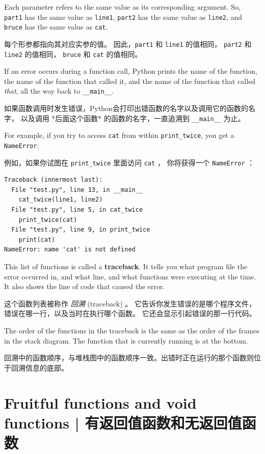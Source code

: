Each parameter refers to the same value as its corresponding
argument.  So, {\tt part1} has the same value as
{\tt line1}, {\tt part2} has the same value as {\tt line2},
and {\tt bruce} has the same value as {\tt cat}.

每个形参都指向其对应实参的值。
因此，\lstinline{part1} 和 \lstinline{line1} 的值相同， \lstinline{part2} 和 \lstinline{line2} 的值相同， \lstinline{bruce} 和 \lstinline{cat} 的值相同。

If an error occurs during a function call, Python prints the
name of the function, the name of the function that called
it, and the name of the function that called {\em that}, all the
way back to \verb"__main__".

如果函数调用时发生错误，Python会打印出错函数的名字以及调用它的函数的名字，
以及调用 *后面这个函数* 的函数的名字，一直追溯到 \lstinline{__main__} 为止。

For example, if you try to access {\tt cat} from within
\verb"print_twice", you get a {\tt NameError}:

例如，如果你试图在 \lstinline{print_twice} 里面访问 \lstinline{cat} ，
你将获得一个 \lstinline{NameError} ：

\begin{lstlisting}
Traceback (innermost last):
  File "test.py", line 13, in __main__
    cat_twice(line1, line2)
  File "test.py", line 5, in cat_twice
    print_twice(cat)
  File "test.py", line 9, in print_twice
    print(cat)
NameError: name 'cat' is not defined
\end{lstlisting}
%
This list of functions is called a {\bf traceback}.  It tells you what
program file the error occurred in, and what line, and what functions
were executing at the time.  It also shows the line of code that
caused the error.

这个函数列表被称作 \emph{回溯} (traceback) 。
它告诉你发生错误的是哪个程序文件，错误在哪一行，以及当时在执行哪个函数。
它还会显示引起错误的那一行代码。

The order of the functions in the traceback is the same as the
order of the frames in the stack diagram.  The function that is
currently running is at the bottom.

回溯中的函数顺序，与堆栈图中的函数顺序一致。出错时正在运行的那个函数则位于回溯信息的底部。


%
\section{Fruitful functions and void functions  |  有返回值函数和无返回值函数}
  
  
  
  


